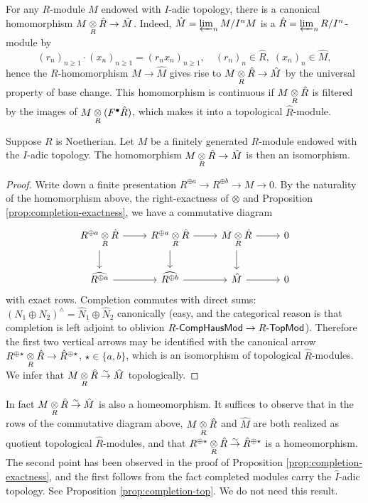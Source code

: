 For any $R$-module $M$ endowed with $I$-adic topology, there is a canonical homomorphism $M \underset{R}{\otimes} \hat{R} \to \hat{M}$. Indeed, $\hat{M} = \varprojlim_n M/I^n M$ is a $\hat{R} = \varprojlim_n R/I^n$-module by
\[ (r_n)_{n \geq 1} \cdot (x_n)_{n \geq 1} = (r_n x_n)_{n \geq 1}, \quad (r_n)_n \in \hat{R}, \; (x_n)_n \in \hat{M}, \]
hence the $R$-homomorphism $M \to \hat{M}$ gives rise to $M \underset{R}{\otimes} \hat{R} \to \hat{M}$ by the universal property of base change. This homomorphism is continuous if $M \underset{R}{\otimes} \hat{R}$ is filtered by the images of $M \underset{R}{\otimes} (F^\bullet \hat{R})$, which makes it into a topological $\hat{R}$-module.

\begin{theorem}\label{prop:completion-tensor}
	Suppose $R$ is Noetherian. Let $M$ be a finitely generated $R$-module endowed with the $I$-adic topology. The homomorphism $M \underset{R}{\otimes} \hat{R} \to \hat{M}$ is then an isomorphism.
\end{theorem}
\begin{proof}
	Write down a finite presentation $R^{\oplus a} \to R^{\oplus b} \to M \to 0$. By the naturality of the homomorphism above, the right-exactness of $\otimes$ and Proposition \ref{prop:completion-exactness}, we have a commutative diagram
	\[\begin{tikzcd}
		R^{\oplus a} \dotimes{R} \hat{R} \arrow[r] \arrow[d] & R^{\oplus a} \dotimes{R} \hat{R} \arrow[r] \arrow[d] & M \dotimes{R} \hat{R} \arrow[r] \arrow[d] & 0 \\
		\widehat{R^{\oplus a}} \arrow[r] & \widehat{R^{\oplus b}} \arrow[r] & \hat{M} \arrow[r] & 0
	\end{tikzcd}\]
	with exact rows. Completion commutes with direct sums: $(N_1 \oplus N_2)^\wedge = \hat{N}_1 \oplus \hat{N}_2$ canonically (easy, and the categorical reason is that completion is left adjoint to oblivion $R\text{-}\mathsf{CompHausMod} \to R\text{-}\mathsf{TopMod}$). Therefore the first two vertical arrows may be identified with the canonical arrow $R^{\oplus \star} \underset{R}{\otimes} \hat{R} \to \hat{R}^{\oplus \star}$, $\star \in \{a,b\}$, which is an isomorphism of topological $\hat{R}$-modules. We infer that $M \underset{R}{\otimes} \hat{R} \stackrel{\sim}{\rightarrow} \hat{M}$ topologically.
\end{proof}
\begin{remark}
	In fact $M \underset{R}{\otimes} \hat{R} \stackrel{\sim}{\rightarrow} \hat{M}$ is also a homeomorphism. It suffices to observe that in the rows of the commutative diagram above, $M \underset{R}{\otimes} \hat{R}$ and $\hat{M}$ are both realized as quotient topological $\hat{R}$-modules, and that $R^{\oplus \star} \underset{R}{\otimes} \hat{R} \stackrel{\sim}{\rightarrow} \hat{R}^{\oplus \star}$ is a homeomorphism. The second point has been observed in the proof of Proposition \ref{prop:completion-exactness}, and the first follows from the fact completed modules carry the $\hat{I}$-adic topology. See Proposition \ref{prop:completion-top}. We do not need this result.
\end{remark}

